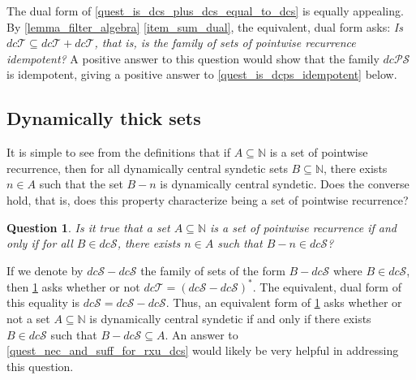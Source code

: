 \documentclass[letter,11pt]{article}
\theoremstyle{plain}
\newtheorem{question}[theorem]{Question}
\theoremstyle{definition}
\theoremstyle{plain}
\theoremstyle{plain}
\numberwithin{equation}{section}
\newcommand{\N}{\mathbb{N}}
\newcommand{\dcsyndetic}{dc\mathcal{S}}
\newcommand{\dcthick}{dc\mathcal{T}}
\newcommand{\dcPS}{dc\mathcal{PS}}
\begin{document}
The dual form of \cref{quest_is_dcs_plus_dcs_equal_to_dcs} is equally appealing.  By \cref{lemma_filter_algebra} \eqref{item_sum_dual}, the equivalent, dual form asks: \emph{Is $\dcthick \subseteq \dcthick + \dcthick$, that is, is the family of sets of pointwise recurrence idempotent?}  A positive answer to this question would show that the family $\dcPS$ is idempotent, giving a positive answer to \cref{quest_is_dcps_idempotent} below.


\subsection{Dynamically thick sets}
\label{sec_dy_thick_sets}

It is simple to see from the definitions that if $A \subseteq \N$ is a set of pointwise recurrence, then for all dynamically central syndetic sets $B \subseteq \N$, there exists $n \in A$ such that the set $B-n$ is dynamically central syndetic.  Does the converse hold, that is, does this property characterize being a set of pointwise recurrence?

\begin{question}
\label{quest_alt_char_of_dcthick}
    Is it true that a set $A \subseteq \N$ is a set of pointwise recurrence if and only if for all $B \in \dcsyndetic$, there exists $n \in A$ such that $B-n \in \dcsyndetic$?
\end{question}

If we denote by $\dcsyndetic - \dcsyndetic$ the family of sets of the form $B - \dcsyndetic$ where $B \in \dcsyndetic$, then \cref{quest_alt_char_of_dcthick} asks whether or not $\dcthick = (\dcsyndetic - \dcsyndetic)^*$.  The equivalent, dual form of this equality is $\dcsyndetic = \dcsyndetic - \dcsyndetic.$ Thus, an equivalent form of \cref{quest_alt_char_of_dcthick} asks whether or not a set $A \subseteq \N$ is dynamically central syndetic if and only if there exists $B \in \dcsyndetic$ such that $B - \dcsyndetic \subseteq A$.  An answer to \cref{quest_nec_and_suff_for_rxu_dcs} would likely be very helpful in addressing this question.
\end{document}
